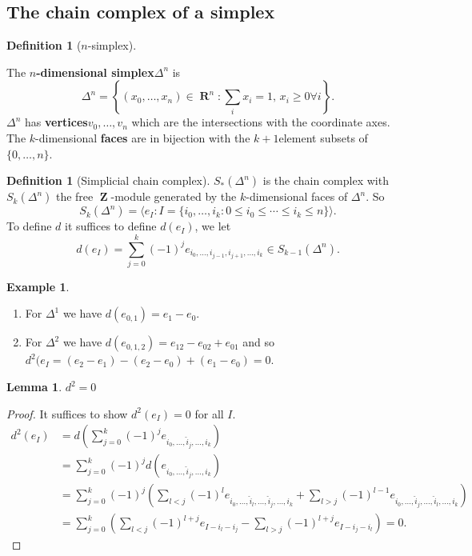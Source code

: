 \documentclass[10pt,]{book}
\newcommand{\lt}{<}
\newcommand{\gt}{>}
\newcommand{\terminology}[1]{\textbf{#1}}
\theoremstyle{plain}
\newtheorem{lemma}[theorem]{Lemma}
\theoremstyle{definition}
\newtheorem{definition}[theorem]{Definition}
\newtheorem{example}[theorem]{Example}
\numberwithin{equation}{section}
\DeclareMathOperator{\RR}{\mathbf{R}}
\DeclareMathOperator{\ZZ}{\mathbf{Z}}
\begin{document}
\subsection[The chain complex of a simplex]{The chain complex of a simplex}\label{subsection-4}
\begin{definition}[\(n\)-simplex]\label{definition-8}

              The \terminology{\(n\)-dimensional simplex}\(\Delta^n\) is \[\Delta^n = \left\{ (x_0,\ldots,x_n)\in\RR^n : \sum_{i} x_i = 1,\, x_i \ge 0 \forall i\right\}.\]\(\Delta^n\) has \terminology{vertices}\(v_0,\ldots,v_n\) which are the intersections with the coordinate axes. The \(k\)-dimensional \terminology{faces} are in bijection with the \(k+1\)element subsets of \(\{0,\ldots,n\}\).
            \end{definition}
\begin{definition}[Simplicial chain complex]\label{definition-9}
\(S_*(\Delta^n)\) is the chain complex with \(S_k(\Delta^n)\) the free \(\ZZ\)-module generated by the \(k\)-dimensional faces of \(\Delta^n\).
              So
              \[
                S_k(\Delta^n) = \langle e_I : I = \{i_0,\ldots,i_k : 0 \le i_0 \le \cdots \le i_k \le n \}\rangle.
              \]
              To define \(d\) it suffices to define \(d(e_I)\), we let \[d(e_I) = \sum_{j = 0}^{k}(-1)^j e_{i_0,\ldots,i_{j-1}, i_{j+1},\ldots,i_k}\in S_{k-1}(\Delta^n).\]\end{definition}
\begin{example}\label{example-5}
\begin{enumerate}
\item{}For \(\Delta^1\) we have \(d(e_{0,1}) = e_1 - e_0\).\item{}For \(\Delta^2\) we have \(d(e_{0,1,2}) = e_{12} - e_{02} + e_{01}\) and so \(d^2(e_{I} = (e_2 - e_1) - (e_2 - e_0) + (e_1 - e_0) = 0\).\end{enumerate}
\end{example}
\begin{lemma}\label{lemma-3}
\(d^2 = 0\)\end{lemma}
\begin{proof}

              It suffices to show \(d^2(e_I) = 0\) for all \(I\).
              \begin{align*}
d^2(e_I) &= d\left(\sum_{j = 0}^{k} (-1)^j e_{i_0,\ldots,\hat{i}_j,\ldots,i_k}\right)\\
&= \sum_{j = 0}^{k} (-1)^j d\left(e_{i_0,\ldots,\hat{i}_j,\ldots,i_k} \right)\\
&= \sum_{j = 0}^{k} (-1)^j\left( \sum_{l \lt j} (-1)^l e_{i_0,\ldots,\hat{i}_l,\ldots,\hat{i}_j,\ldots,i_k} + \sum_{l \gt j} (-1)^{l-1} e_{i_0,\ldots,\hat{i}_j,\ldots,\hat{i}_l,\ldots,i_k}\right)\\
&= \sum_{j = 0}^{k} \left( \sum_{l \lt j} (-1)^{l+j} e_{I - i_l - i_j} - \sum_{l \gt j} (-1)^{l+j} e_{I - i_j - i_l}\right) = 0.
\end{align*}\end{proof}
\end{document}
